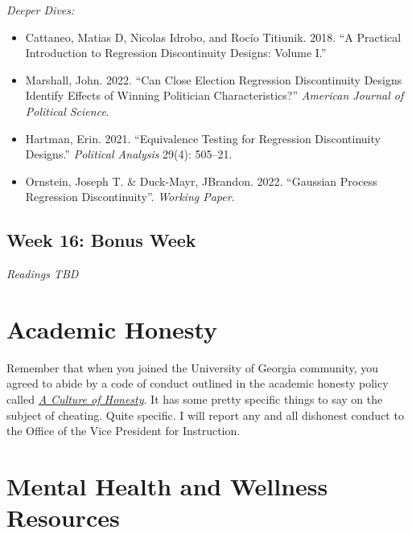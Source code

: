 \documentclass[11pt, letterpaper]{article}
\begin{document}
\noindent \textit{Deeper Dives:}

\begin{itemize}
	
	\item Cattaneo, Matias D, Nicolas Idrobo, and Rocío Titiunik. 2018. ``A Practical Introduction to Regression Discontinuity Designs: Volume I.''
	\item Marshall, John. 2022. ``Can Close Election Regression Discontinuity Designs Identify Effects of Winning Politician Characteristics?'' \textit{American Journal of Political Science}.
	\item Hartman, Erin. 2021. ``Equivalence Testing for Regression Discontinuity Designs.'' \textit{Political Analysis} 29(4): 505–21.
	\item Ornstein, Joseph T. \& Duck-Mayr, JBrandon. 2022. ``Gaussian Process Regression Discontinuity''. \textit{Working Paper}.
\end{itemize}

\subsection*{Week 16: Bonus Week}

\textit{Readings TBD}


\section*{Academic Honesty}

Remember that when you joined the University of Georgia community, you agreed to abide by a code of conduct outlined in the academic honesty policy called \href{https://honesty.uga.edu/Academic-Honesty-Policy/Introduction/}{\textit{A Culture of Honesty}}. It has some pretty specific things to say on the subject of cheating. Quite specific. I will report any and all dishonest conduct to the Office of the Vice President for Instruction.

\section*{Mental Health and Wellness Resources}
\end{document}
